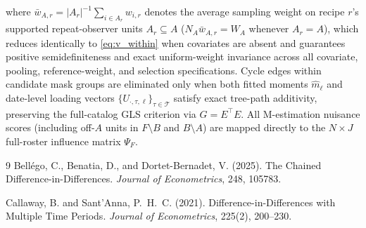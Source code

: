 \documentclass[11pt]{article}
\theoremstyle{definition}
\theoremstyle{remark}
\begin{document}
\begin{enumerate}
\[\]
where $\bar{w}_{A,r} = |A_r|^{-1} \sum_{i \in A_r} w_{i,r}$ denotes the average sampling weight on recipe $r$'s supported repeat-observer units $A_r \subseteq A$ ($N_A \bar{w}_{A,r} = W_A$ whenever $A_r = A$), which reduces identically to \eqref{eq:v_within} when covariates are absent and guarantees positive semidefiniteness and exact uniform-weight invariance across all covariate, pooling, reference-weight, and selection specifications. Cycle edges within candidate mask groups are eliminated only when both fitted moments $\hat{m}_\ell$ and date-level loading vectors $\{U_{\cdot,\tau,\ell}\}_{\tau \in \mathcal{T}}$ satisfy exact tree-path additivity, preserving the full-catalog GLS criterion via $G = E^\top E$. All M-estimation nuisance scores (including off-$A$ units in $F \setminus B$ and $B \setminus A$) are mapped directly to the $N \times J$ full-roster influence matrix $\Psi_F$.
\end{enumerate}

\begin{thebibliography}{9}
Bell\'ego, C., Benatia, D., and Dortet-Bernadet, V. (2025).
\newblock The Chained Difference-in-Differences.
\newblock \emph{Journal of Econometrics}, 248, 105783.

Callaway, B. and Sant'Anna, P.~H.~C. (2021).
\newblock Difference-in-Differences with Multiple Time Periods.
\newblock \emph{Journal of Econometrics}, 225(2), 200--230.
\end{thebibliography}
\end{document}
